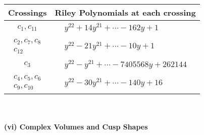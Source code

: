 \documentclass[1p]{elsarticle_modified}
\theoremstyle{definition}
\begin{document}
\begin{tabular}{m{50pt}|m{274pt}}
Crossings & \hspace{64pt}Riley Polynomials at each crossing \\
\hline $$\begin{aligned}c_{1},c_{11}\end{aligned}$$&$\begin{aligned}
&y^{22}+14 y^{21}+\cdots-162 y+1
\end{aligned}$\\
\hline $$\begin{aligned}c_{2},c_{7},c_{8}\\c_{12}\end{aligned}$$&$\begin{aligned}
&y^{22}-21 y^{21}+\cdots-10 y+1
\end{aligned}$\\
\hline $$\begin{aligned}c_{3}\end{aligned}$$&$\begin{aligned}
&y^{22}- y^{21}+\cdots-7405568 y+262144
\end{aligned}$\\
\hline $$\begin{aligned}c_{4},c_{5},c_{6}\\c_{9},c_{10}\end{aligned}$$&$\begin{aligned}
&y^{22}-30 y^{21}+\cdots-140 y+16
\end{aligned}$\\
\hline
\end{tabular}\\~\\
\newpage\flushleft \textbf{(vi) Complex Volumes and Cusp Shapes}
\end{document}
